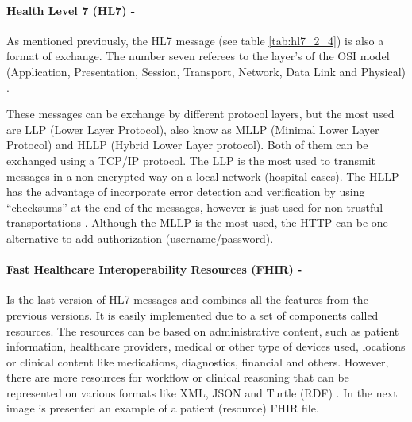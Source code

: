 \documentclass[mim_thesis.tex]{subfiles}
\begin{document}
\paragraph{\textbf{Health Level 7 (HL7) -}}
As mentioned previously, the HL7 message (see table \ref{tab:hl7_2_4}) is also a format of exchange. The number seven referees to the layer’s of the OSI model (Application, Presentation, Session, Transport, Network, Data Link and Physical) \citep{iso1994iec}.

These messages can be exchange by different protocol layers, but the most used are LLP (Lower Layer Protocol), also know as MLLP (Minimal Lower Layer Protocol) and HLLP (Hybrid Lower Layer protocol).  Both of them can be exchanged using a TCP/IP protocol. The LLP is the most used to transmit messages in a non-encrypted way on a local network (hospital cases). The HLLP has the advantage of incorporate error detection and verification by using “checksums” at the end of the messages, however is just used for non-trustful transportations \citep{grieve2012hl7}. Although the MLLP is the most used, the HTTP can be one alternative to add authorization (username/password).


\paragraph{\textbf{Fast Healthcare Interoperability Resources (FHIR) -}}
Is the last version of HL7 messages and combines all the features from the previous versions. It is easily implemented due to a set of components called resources. The resources can be based on administrative content, such as patient information, healthcare providers, medical or other type of devices used, locations or clinical content like medications, diagnostics, financial and others. However, there are more resources for workflow or clinical reasoning that can be represented on various formats like XML, JSON and Turtle (RDF) \citep{FHIR2017}. In the next image is presented an example of a patient (resource) FHIR file.
\end{document}
